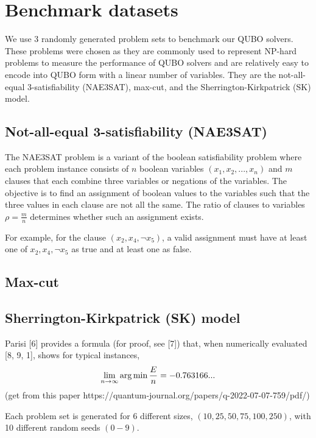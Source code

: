 \section{Benchmark datasets}
We use 3 randomly generated problem sets to benchmark our QUBO solvers. These problems were chosen as they are commonly used to represent NP-hard problems to measure the performance of QUBO solvers and are relatively easy to encode into QUBO form with a linear number of variables. They are the not-all-equal 3-satisfiability (NAE3SAT), max-cut, and the Sherrington-Kirkpatrick (SK) model.

\subsection*{Not-all-equal 3-satisfiability (NAE3SAT)}
The NAE3SAT problem is a variant of the boolean satisfiability problem where each problem instance consists of $n$ boolean variables $(x_1, x_2, ..., x_n)$ and $m$ clauses that each combine three variables or negations of the variables. The objective is to find an assignment of boolean values to the variables such that the three values in each clause are not all the same. The ratio of clauses to variables $\rho = \frac{m}{n}$ determines whether such an assignment exists.

For example, for the clause $(x_2, x_4, \neg x_5)$, a valid assignment must have at least one of $x_2, x_4, \neg x_5$ as true and at least one as false.


\subsection*{Max-cut}
\subsection*{Sherrington-Kirkpatrick (SK) model}
Parisi [6] provides a formula (for proof, see [7])
that, when numerically evaluated [8, 9, 1], shows for typical instances,
\begin{equation*}
    \lim_{n\rightarrow \infty} \operatorname*{arg\,min} \frac{E}{n} = -0.763166...
\end{equation*}
(get from this paper https://quantum-journal.org/papers/q-2022-07-07-759/pdf/)

Each problem set is generated for 6 different sizes, $(10, 25, 50, 75, 100, 250)$, with 10 different random seeds $(0-9)$.




